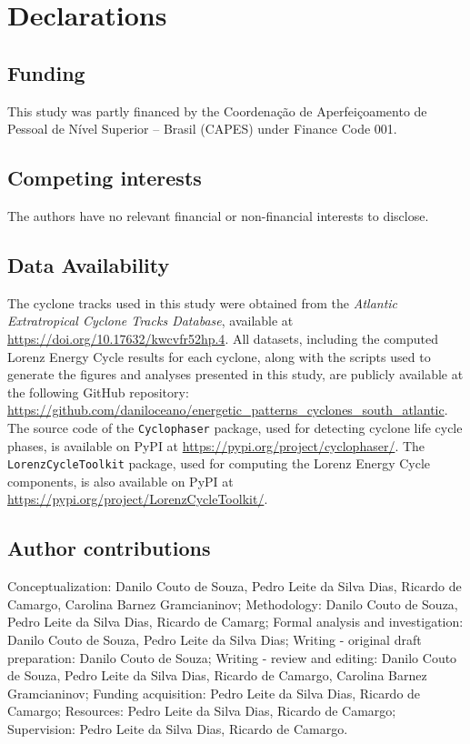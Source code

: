 \documentclass[pdflatex,sn-chicago]{sn-jnl}%
\theoremstyle{plain}
\theoremstyle{definition}
\theoremstyle{remark}
\theoremstyle{definition}
\begin{document}
\section*{Declarations}

\subsection*{Funding}

This study was partly financed by the Coordenação de Aperfeiçoamento de Pessoal de Nível Superior – Brasil (CAPES) under Finance Code 001.

\subsection*{Competing interests}

The authors have no relevant financial or non-financial interests to disclose.

\subsection*{Data Availability}

The cyclone tracks used in this study were obtained from the \textit{Atlantic Extratropical Cyclone Tracks Database}, available at \url{https://doi.org/10.17632/kwcvfr52hp.4}. All datasets, including the computed Lorenz Energy Cycle results for each cyclone, along with the scripts used to generate the figures and analyses presented in this study, are publicly available at the following GitHub repository: \url{https://github.com/daniloceano/energetic_patterns_cyclones_south_atlantic}. The source code of the \texttt{Cyclophaser} package, used for detecting cyclone life cycle phases, is available on PyPI at \url{https://pypi.org/project/cyclophaser/}. The \texttt{LorenzCycleToolkit} package, used for computing the Lorenz Energy Cycle components, is also available on PyPI at \url{https://pypi.org/project/LorenzCycleToolkit/}.

\subsection*{Author contributions}

Conceptualization: Danilo Couto de Souza, Pedro Leite da Silva Dias, Ricardo de Camargo, Carolina Barnez Gramcianinov; Methodology: Danilo Couto de Souza, Pedro Leite da Silva Dias, Ricardo de Camarg; Formal analysis and investigation: Danilo Couto de Souza, Pedro Leite da Silva Dias; Writing - original draft preparation: Danilo Couto de Souza; Writing - review and editing: Danilo Couto de Souza, Pedro Leite da Silva Dias, Ricardo de Camargo, Carolina Barnez Gramcianinov; Funding acquisition: Pedro Leite da Silva Dias, Ricardo de Camargo; Resources: Pedro Leite da Silva Dias, Ricardo de Camargo; Supervision: Pedro Leite da Silva Dias, Ricardo de Camargo.
\end{document}
